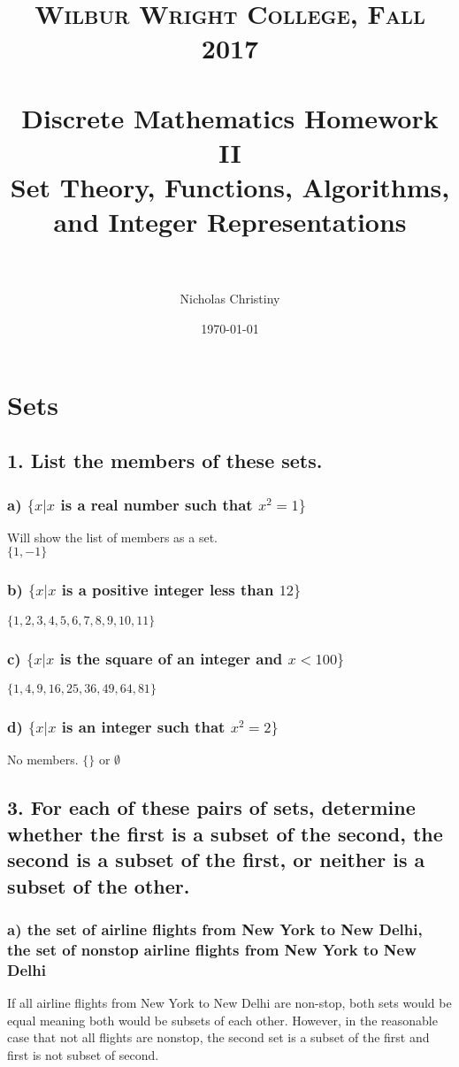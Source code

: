 \documentclass[11pt, oneside]{article} %
\title{	
\normalfont \normalsize 
\textsc{Wilbur Wright College, Fall 2017} \\ [25pt] %
\horrule{0.5pt} \\[0.4cm] %
\huge Discrete Mathematics Homework II \\
\huge Set Theory, Functions, Algorithms, and Integer Representations \\ %
\horrule{2pt} \\[0.5cm] %
}
\author{Nicholas Christiny} %
\date{\normalsize\today} %
\numberwithin{equation}{section} %
\numberwithin{figure}{section} %
\numberwithin{table}{section} %
\begin{document}
\maketitle %


\section{ Sets}
\subsection{1. List the members of these sets.}
\subsubsection{a) $\{x| x$ is a real number such that $x^2 =1\}$}
Will show the list of members as a set. \\
$\{1, -1\}$
\subsubsection{b) $\{x | x$ is a positive integer less than $12\}$}
$\{1,2,3,4,5,6,7,8,9,10,11\}$
\subsubsection{c) $\{x|x$ is the square of an integer and $x<100\}$}
$\{1,4,9,16,25,36,49,64,81\}$
\subsubsection{d) $\{x|x$ is an integer such that $x^2 =2\}$}
No members. $\{\}$ or $\emptyset$


\subsection{3. For each of these pairs of sets, determine whether the first is a subset of the second, the second is a subset of the first, or neither is a subset of the other.}
\subsubsection{a) the set of airline flights from New York to New Delhi,\\
the set of nonstop airline flights from New York to New Delhi}
If all airline flights from New York to New Delhi are non-stop, both sets would be equal meaning both would be subsets of each other. However, in the reasonable case that not all flights are nonstop, the second set is a subset of the first and first is not subset of second.
\end{document}

